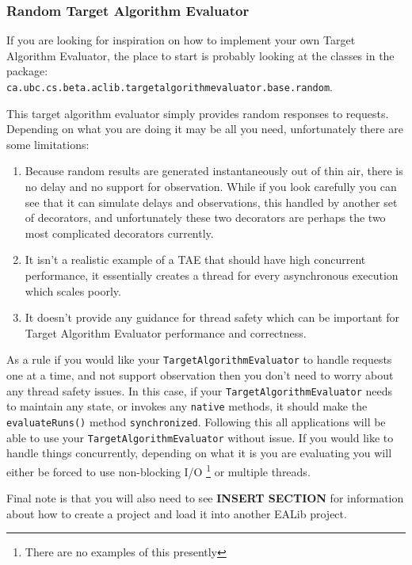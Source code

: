 \documentclass[11pt,letterpaper,oneside]{article}
\begin{document}
\subsubsection{Random Target Algorithm Evaluator}

If you are looking for inspiration on how to implement your own Target Algorithm Evaluator, the place to start is probably looking at the classes in the package: \\
\texttt{ca.ubc.cs.beta.aclib.targetalgorithmevaluator.base.random}.

This target algorithm evaluator simply provides random responses to requests. Depending on what you are doing it may be all you need, unfortunately there are some limitations:

\begin{enumerate}
\item Because random results are generated instantaneously out of thin air, there is no delay and no support for observation. While if you look carefully you can see that it can simulate delays and observations, this handled by another set of decorators, and unfortunately these two decorators are perhaps the two most complicated decorators currently.
\item It isn't a realistic example of a TAE that should have high concurrent performance, it essentially creates a thread for every asynchronous execution which scales poorly.
\item It doesn't provide any guidance for thread safety which can be important for Target Algorithm Evaluator performance and correctness.
\end{enumerate}

As a rule if you would like your \texttt{TargetAlgorithmEvaluator} to handle requests one at a time, and not support observation then you don't need to worry about any thread safety issues. In this case, if your \texttt{TargetAlgorithmEvaluator} needs to maintain any state, or invokes any \texttt{native} methods, it should make the \texttt{evaluateRuns()} method \texttt{synchronized}. Following this all applications will be able to use your \texttt{TargetAlgorithmEvaluator} without issue. If you would like to handle things concurrently, depending on what it is you are evaluating you will either be forced to use non-blocking I/O \footnote{There are no examples of this presently} or multiple threads.

Final note is that you will also need to see {\Large \textbf{INSERT SECTION}} for information about how to create a project and load it into another EALib project.
\end{document}

